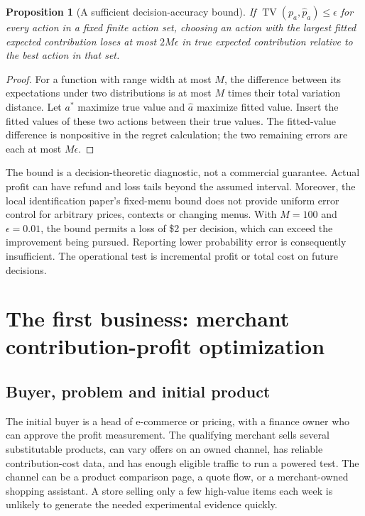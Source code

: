 \documentclass[11pt]{article}
\newcommand{\TV}{\operatorname{TV}}
\newtheorem{proposition}{Proposition}
\theoremstyle{remark}\newtheorem{example}{Example}
\begin{document}
\begin{proposition}[A sufficient decision-accuracy bound]\label{prop:value}
If $\TV(p_a,\widehat p_a)\leq\epsilon$ for every action in a fixed finite
action set, choosing an action with the largest fitted expected contribution
loses at most $2M\epsilon$ in true expected contribution relative to the
best action in that set.
\end{proposition}
\begin{proof}
For a function with range width at most $M$, the difference between its
expectations under two distributions is at most $M$ times their total
variation distance. Let $a^*$ maximize true value and $\widehat a$ maximize
fitted value. Insert the fitted values of these two actions between their true
values. The fitted-value difference is nonpositive in the regret calculation;
the two remaining errors are each at most $M\epsilon$.
\end{proof}

The bound is a decision-theoretic diagnostic, not a commercial guarantee.
Actual profit can have refund and loss tails beyond the assumed interval.
Moreover, the local identification paper's fixed-menu bound does not provide
uniform error control for arbitrary prices, contexts or changing menus.
With $M=100$ and $\epsilon=0.01$, the bound permits a loss of \$2 per decision,
which can exceed the improvement being pursued. Reporting lower probability
error is consequently insufficient. The operational test is incremental profit
or total cost on future decisions.

\section{The first business: merchant contribution-profit optimization}
\subsection{Buyer, problem and initial product}
The initial buyer is a head of e-commerce or pricing, with a finance owner who
can approve the profit measurement. The qualifying merchant sells several
substitutable products, can vary offers on an owned channel, has reliable
contribution-cost data, and has enough eligible traffic to run a powered test.
The channel can be a product comparison page, a quote flow, or a merchant-owned
shopping assistant. A store selling only a few high-value items each week is
unlikely to generate the needed experimental evidence quickly.
\end{document}
